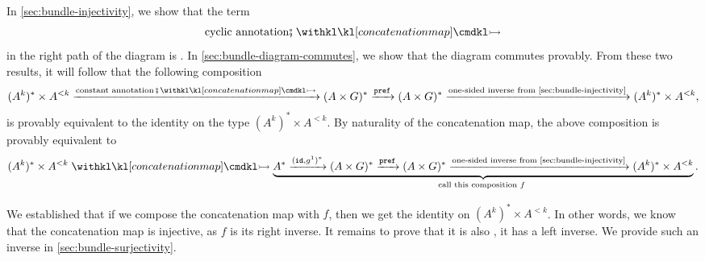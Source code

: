 In \cref{sec:bundle-injectivity}, we show that the term
\begin{align*}
    \text{cyclic annotation}\comp \concmap
\end{align*}
in the right path of the diagram is . In \cref{sec:bundle-diagram-commutes}, we show that the diagram commutes provably. From these two results, it will follow that the
following composition
\begin{align*}
    (A^k)^* \times A^{<k}
    \xrightarrow{\text{constant annotation}\comp\concmap}
    (A\times G)^*
    \xrightarrow \prefterm
    (A \times G)^*
    \xrightarrow {\text{one-sided inverse from \cref{sec:bundle-injectivity}}}
    (A^k)^* \times A^{<k},
\end{align*}
is provably equivalent to the identity on the type $(A^k)^* \times A^{<k}$. By naturality of the concatenation map, the above composition is provably equivalent to
\begin{align*}
    (A^k)^* \times A^{<k}
    \concmap
    \myunderbrace{  A^* \xrightarrow{(\idterm, g^1)^*}
        (A\times G)^*
        \xrightarrow \prefterm
        (A \times G)^*
        \xrightarrow {\text{one-sided inverse from \cref{sec:bundle-injectivity}}}
        (A^k)^* \times A^{<k}
    }{call this composition $f$}.
\end{align*}

We established that if we compose the concatenation map with $f$, then we get the identity on $(A^k)^* \times A^{<k}$. In other words, we know that the concatenation map is injective, as $f$ is its right inverse. It remains to prove that it is also , it has a left inverse. We provide such an inverse in \cref{sec:bundle-surjectivity}.


